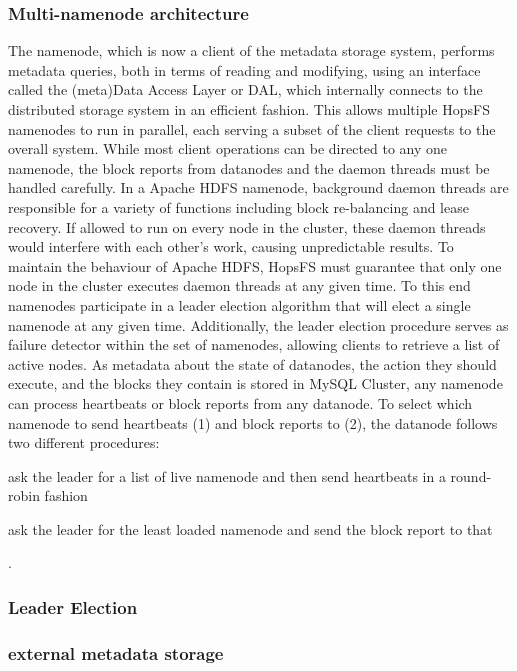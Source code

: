 \subsubsection{Multi-namenode architecture}
The namenode, which is now a client of the metadata storage system, performs metadata queries, both in terms of reading and modifying, using an interface called the (meta)Data Access Layer or DAL, which internally connects to the distributed storage system in an efficient fashion.
This allows multiple HopsFS namenodes to run in parallel, each serving a subset of the client requests to the overall system.
While most client operations can be directed to any one namenode, the block reports from datanodes and the daemon threads must be handled carefully.
In a Apache HDFS namenode, background daemon threads are responsible for a variety of functions including block re-balancing and lease recovery.
If allowed to run on every node in the cluster, these daemon threads would interfere with each other's work, causing unpredictable results.
To maintain the behaviour of Apache HDFS, HopsFS must guarantee that only one node in the cluster executes daemon threads at any given time.
To this end namenodes participate in a leader election algorithm that will elect a single namenode at any given time.
Additionally, the leader election procedure serves as failure detector within the set of namenodes, allowing clients to retrieve a list of active nodes.
As metadata about the state of datanodes, the action they should execute, and the blocks they contain is stored in MySQL Cluster, any namenode can process heartbeats or block reports from any datanode.
To select which namenode to send heartbeats (1) and block reports to (2), the datanode follows two different procedures: \begin{inparaenum}[1)]
\item ask the leader for a list of live namenode and then send heartbeats in a round-robin fashion
\item ask the leader for the least loaded namenode and send the block report to that
\end{inparaenum}.

\subsubsection{Leader Election}
\subsubsection{external metadata storage}
